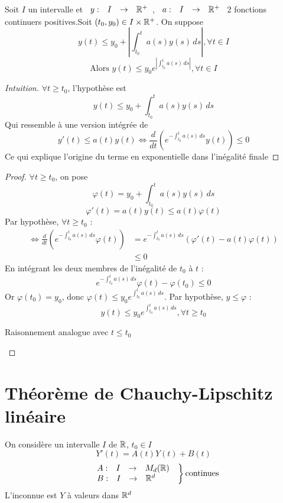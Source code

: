 \documentclass[]{report}
\begin{document}
\begin{lm}
    Soit $I$ un intervalle et $\begin{array}{ccccc} y : & I & \to & \mathbb{R}^+ \end{array}$, $\begin{array}{ccccc} a : & I & \to & \mathbb{R}^+ \end{array}$ 2 fonctions continuers positives.Soit $(t_0,y_0)\in I\times \mathbb{R}^+$. On suppose 
    \[y(t)\le y_0+ \left|\int_{t_0}^t a(s)y(s)\,ds\right|,\forall t\in I\]
    \[\text{Alors }y(t)\le y_0 e^{\left|\int_{t_0}^t a(s)\,ds \right|},\forall t\in I\]
\end{lm}

\begin{proof}[Intuition]
    $\forall t\ge t_0$, l'hypothèse est 
    \[y(t)\le y_0+\int_{t_0}^t a(s) y(s)\, ds\]
    Qui ressemble à une version intégrée de 
    \[y'(t)\le a(t)y(t)\iff \frac{d}{dt}(e^{-\int_{t_0}^t a(s)\,ds}y(t))\le 0\]
    Ce qui explique l'origine du terme en exponentielle dans l'inégalité finale
\end{proof}

\begin{proof}
    $\forall t\ge t_0$, on pose 
    \[\varphi (t)=y_0+\int_{t_0}^t a(s) y(s)\,ds\]
    \[\varphi'(t)=a(t)y(t)\le a(t)\varphi(t)\]
    Par hypothèse, $\forall t\ge t_0$ :
    \begin{align*}
        \iff \frac{d}{dt}\left(e^{-\int_{t_0}^t a(s)\,ds}\varphi(t) \right)&=e^{-\int_{t_0}^t a(s)\,ds}(\varphi'(t)-a(t)\varphi(t))\\
        &\le 0
    \end{align*}
    En intégrant les deux membres de l'inégalité de $t_0$ à $t$ :
    \[e^{-\int_{t_0}^ta(s)\,ds}\varphi(t)-\varphi(t_0)\le 0\]
    Or $\varphi(t_0)=y_0$, donc $\varphi(t)\le y_0 e^{\int_{t_0}^t a(s)\,ds}$. Par hypothèse, $y\le \varphi$ :
    \[y(t)\le y_0 e^{\int_{t_0}^t a(s)\,ds}, \forall t\ge t_0\]
    \begin{center}
        Raisonnement analogue avec $t\le t_0$
    \end{center}
\end{proof}

\section{Théorème de Chauchy-Lipschitz linéaire}

On considère un intervalle $I$ de $\mathbb{R}$, $t_0\in I$
\[Y'(t)=A(t)Y(t)+B(t)\]
\[\left.\begin{array}{ll}
    \begin{array}{ccccc} A : & I & \to & M_d(\mathbb{R}) \end{array}\\
    \begin{array}{ccccc} B : & I & \to & \mathbb{R}^d \end{array}
\end{array}\right\} \text{continues}\]
L'inconnue est $Y$ à valeurs dans $\mathbb{R}^d$
\end{document}
